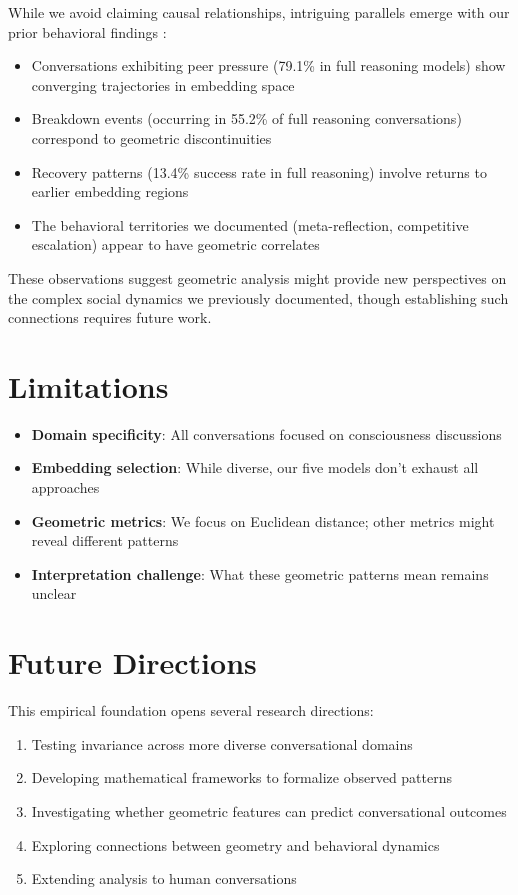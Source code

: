 \documentclass[11pt,letterpaper]{article}
\begin{document}
While we avoid claiming causal relationships, intriguing parallels emerge with our prior behavioral findings \citep{garcia2025peer}:
\begin{itemize}
\item Conversations exhibiting peer pressure (79.1\% in full reasoning models) show converging trajectories in embedding space
\item Breakdown events (occurring in 55.2\% of full reasoning conversations) correspond to geometric discontinuities
\item Recovery patterns (13.4\% success rate in full reasoning) involve returns to earlier embedding regions
\item The behavioral territories we documented (meta-reflection, competitive escalation) appear to have geometric correlates
\end{itemize}

These observations suggest geometric analysis might provide new perspectives on the complex social dynamics we previously documented, though establishing such connections requires future work.

\section{Limitations}

\begin{itemize}
\item \textbf{Domain specificity}: All conversations focused on consciousness discussions
\item \textbf{Embedding selection}: While diverse, our five models don't exhaust all approaches
\item \textbf{Geometric metrics}: We focus on Euclidean distance; other metrics might reveal different patterns
\item \textbf{Interpretation challenge}: What these geometric patterns mean remains unclear
\end{itemize}

\section{Future Directions}

This empirical foundation opens several research directions:

\begin{enumerate}
\item Testing invariance across more diverse conversational domains
\item Developing mathematical frameworks to formalize observed patterns
\item Investigating whether geometric features can predict conversational outcomes
\item Exploring connections between geometry and behavioral dynamics
\item Extending analysis to human conversations
\end{enumerate}
\end{document}
